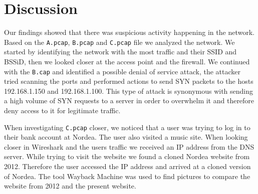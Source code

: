 \section{Discussion}
Our findings showed that there was suspicious activity happening in the network. Based on the \texttt{A.pcap}, \texttt{B.pcap} and \texttt{C.pcap} file we analyzed the network. We started by identifying the network with the most traffic and their SSID and BSSiD, then we looked closer at the access point and the firewall. We continued with the \texttt{B.cap} and identified a possible denial of service attack, the attacker tried scanning the ports and performed actions to send SYN packets to the hosts 192.168.1.150 and 192.168.1.100. This type of attack is synonymous with sending a high volume of SYN requests to a server in order to overwhelm it and therefore deny access to it for legitimate traffic. 
\newline

\noindent When investigating \texttt{C.pcap} closer, we noticed that a user was trying to log in to their bank account at Nordea. The user also visited a music site. When looking closer in Wireshark and the users traffic we received an IP address from the DNS server. While trying to visit the website we found a cloned Nordea website from 2012. Therefore the user accessed the IP address and arrived at a cloned version of Nordea. The tool Wayback Machine was used to find pictures to compare the website from 2012 and the present website.